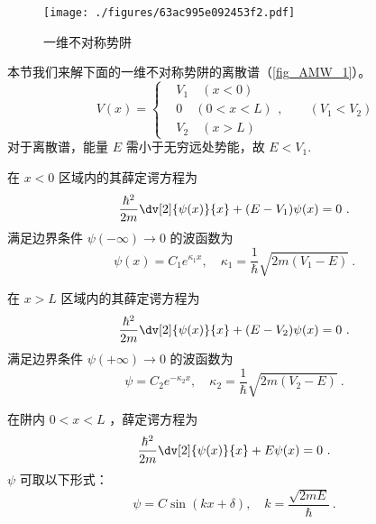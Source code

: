 
\begin{issues}
\issueTODO
{}
\end{issues}

\begin{figure}[ht]
\centering
\texttt{[image: ./figures/63ac995e092453f2.pdf]}
\caption{一维不对称势阱} \label{fig_AMW_1}
\end{figure}
本节我们来解下面的一维不对称势阱的离散谱（\autoref{fig_AMW_1}）。
\begin{equation}
V(x)=\left\{\begin{aligned}
&V_1\quad(x<0)\\
&0\quad (0<x<L)\\
&V_2\quad(x>L)
\end{aligned}\right.
,\qquad (V_1 < V_2)
\end{equation}
对于离散谱，能量 $E$ 需小于无穷远处势能，故 $E<V_1$. 

在 $x<0$ 区域内的其薛定谔方程为
\begin{equation}
\frac{\hbar^2}{2m}\dv[2]{\psi(x)}{x}+(E-V_1)\psi(x)=0~.
\end{equation}
满足边界条件 $\psi(-\infty)\to 0$ 的波函数为
\begin{equation}
\psi(x)=C_1 e^{\kappa_1 x},\quad \kappa_1=\frac{1}{\hbar}\sqrt{2m(V_1-E)}~.
\end{equation}

在 $x>L$ 区域内的其薛定谔方程为
\begin{equation}
\frac{\hbar^2}{2m}\dv[2]{\psi(x)}{x}+(E-V_2)\psi(x)=0~.
\end{equation}
满足边界条件 $\psi(+\infty)\to 0$ 的波函数为
\begin{equation}
\psi=C_2 e^{-\kappa_2 x},\quad \kappa_2=\frac{1}{\hbar}\sqrt{2m(V_2-E)}~.
\end{equation}

在阱内 $0 < x < L$ ，薛定谔方程为
\begin{equation}
\frac{\hbar^2}{2m}\dv[2]{\psi(x)}{x}+E\psi(x)=0~.
\end{equation}
$\psi$ 可取以下形式：
\begin{equation}
\psi=C\sin(kx+\delta),\quad k=\frac{\sqrt{2mE}}{\hbar}~.
\end{equation}

